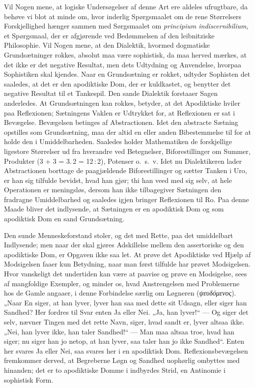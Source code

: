 \documentclass[12pt]{book}
\newcommand{\opage}[1]{\marginnote{\footnotesize\textit{[#1]}}}
\begin{document}
Vil Nogen mene, at logiske Undersøgelser af denne Art ere aldeles ufrugtbare, da behøve vi blot at minde om, hvor inderlig Spørgsmaalet om de rene Størrelsers Forskjellighed hænger sammen med Sørgsmaalet
om \textit{principium indiscernibilium}, et Spørgsmaal, der er afgjørende ved Bedømmelsen af den leibnitziske Philosophie. Vil Nogen mene, at den Dialektik, hvormed dogmatiske Grundsætninger rokkes, absolut maa være sophistisk, da maa herved mærkes, at det ikke er
\opage{257}det negative Resultat, men dets Udtydning og Anvendelse, hvorpaa Sophistiken skal kjendes. Naar en Grundsætning er rokket, udtyder Sophisten det saaledes, at det er den apodiktiske Dom, der er kuldkastet, og benytter det negative Resultat til et Tankespil. Den sande Dialektik forstaaer Sagen anderledes. At Grundsætningen kan rokkes, betyder, at det Apodiktiske hviler paa Reflexionen; Sætningens Vaklen er Udtrykket for, at Reflexionen er sat i Bevægelse. Bevægelsen betinges af Abstractionen. Idet den abstracte Sætning opstilles som Grundsætning, maa der altid en eller anden Bibestemmelse til for at holde den i Umiddelbarheden. Saaledes holder Mathematiken de forskjellige ligestore Størrelser ud fra hverandre ved Betegnelser, Biforestillinger om Summer, Produkter (3 + 3 = 3.\,2 = 12\,:\,2), Potenser o.\ s.\ v. Idet nu Dialektikeren lader Abstractionen borttage de paagjældende Biforestillinger og sætter Tanken i Uro, er han sig tilfulde bevidst, hvad han gjør; thi han veed med sig selv, at hele Operationen er meningsløs,
dersom han ikke tilbagegiver Sætningen den fradragne Umiddelbarhed og saaledes igjen bringer Reflexionen til Ro. Paa denne Maade bliver det indlysende, at Sætningen er en apodiktisk Dom og som apodiktisk Dom en sand Grundsætning.

Den sunde Menneskeforstand stoler, og det med Rette, paa det umiddelbart Indlysende; men naar der skal gjøres Adskillelse mellem den assertoriske og den apodiktiske Dom, er Opgaven ikke saa let. At prøve det Apodiktiske ved Hjælp af Modsigelsen faaer kun Betydning, naar man først tilfulde har prøvet Modsigelsen. Hvor vanskeligt det undertiden kan være at paavise og prøve en Modsigelse, sees af mangfoldige Exempler, og minder os, hvad Anstrengelsen med Problemerne hos de Gamle angaaer, i denne Forbindelse særlig om Løgneren (\textit{ψευδόμενος}). „Naar En siger, at han lyver, lyver han saa med dette sit Udsagn, eller siger han Sandhed? Her fordres til Svar enten Ja eller Nei. „Ja, han lyver!“
\opage{258}--- Og siger det selv, nævner Tingen med det rette Navn, siger, hvad sandt er, lyver altsaa ikke. „Nei, han lyver ikke, han taler Sandhed!“ --- Man maa altsaa troe, hvad han siger; nu siger han jo netop, at han lyver, saa taler han jo ikke Sandhed“. Enten her svares Ja eller Nei, saa svares her i en apodiktisk Dom. Reflexionsbevægelsen fremkommer derved, at Begreberne Løgn og Sandhed uophørlig ombyttes med hinanden; det er to apodiktiske Domme i indbyrdes Strid, en Antinomie i sophistisk Form.
\end{document}
